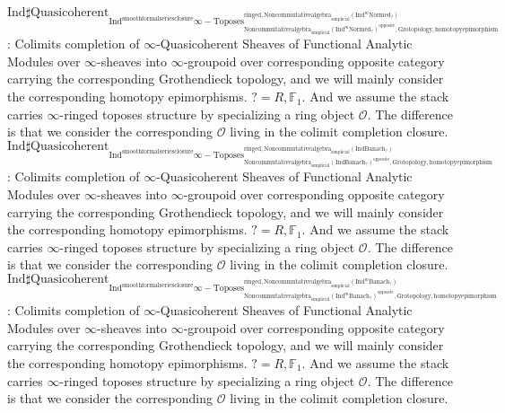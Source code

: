 \documentclass[11pt]{book}
\theoremstyle{definition}
\numberwithin{equation}{section}
\begin{document}
\noindent $\mathrm{Ind}\mathrm{\sharp Quasicoherent}_{\mathrm{Ind}^\text{smoothformalseriesclosure}\infty-\mathrm{Toposes}^{\mathrm{ringed},\mathrm{Noncommutativealgebra}_{\mathrm{simplicial}}(\mathrm{Ind}^m\mathrm{Normed}_?)}_{\mathrm{Noncommutativealgebra}_{\mathrm{simplicial}}(\mathrm{Ind}^m\mathrm{Normed}_?)^\mathrm{opposite},\mathrm{Grotopology,homotopyepimorphism}}}$: Colimits completion of $\infty$-Quasicoherent Sheaves of Functional Analytic Modules over $\infty$-sheaves into $\infty$-groupoid over corresponding opposite category carrying the corresponding Grothendieck topology, and we will mainly consider the corresponding homotopy epimorphisms. $?=R,\mathbb{F}_1$. And we assume the stack carries $\infty$-ringed toposes structure by specializing a ring object $\mathcal{O}$. The difference is that we consider the corresponding $\mathcal{O}$ living in the colimit completion closure.\\
\noindent $\mathrm{Ind}\mathrm{\sharp Quasicoherent}_{\mathrm{Ind}^\text{smoothformalseriesclosure}\infty-\mathrm{Toposes}^{\mathrm{ringed},\mathrm{Noncommutativealgebra}_{\mathrm{simplicial}}(\mathrm{Ind}\mathrm{Banach}_?)}_{\mathrm{Noncommutativealgebra}_{\mathrm{simplicial}}(\mathrm{Ind}\mathrm{Banach}_?)^\mathrm{opposite},\mathrm{Grotopology,homotopyepimorphism}}}$: Colimits completion of $\infty$-Quasicoherent Sheaves of Functional Analytic Modules over $\infty$-sheaves into $\infty$-groupoid over corresponding opposite category carrying the corresponding Grothendieck topology, and we will mainly consider the corresponding homotopy epimorphisms. $?=R,\mathbb{F}_1$. And we assume the stack carries $\infty$-ringed toposes structure by specializing a ring object $\mathcal{O}$. The difference is that we consider the corresponding $\mathcal{O}$ living in the colimit completion closure.\\
\noindent $\mathrm{Ind}\mathrm{\sharp Quasicoherent}_{\mathrm{Ind}^\text{smoothformalseriesclosure}\infty-\mathrm{Toposes}^{\mathrm{ringed},\mathrm{Noncommutativealgebra}_{\mathrm{simplicial}}(\mathrm{Ind}^m\mathrm{Banach}_?)}_{\mathrm{Noncommutativealgebra}_{\mathrm{simplicial}}(\mathrm{Ind}^m\mathrm{Banach}_?)^\mathrm{opposite},\mathrm{Grotopology,homotopyepimorphism}}}$: Colimits completion of $\infty$-Quasicoherent Sheaves of Functional Analytic Modules over $\infty$-sheaves into $\infty$-groupoid over corresponding opposite category carrying the corresponding Grothendieck topology, and we will mainly consider the corresponding homotopy epimorphisms. $?=R,\mathbb{F}_1$. And we assume the stack carries $\infty$-ringed toposes structure by specializing a ring object $\mathcal{O}$. The difference is that we consider the corresponding $\mathcal{O}$ living in the colimit completion closure.\\ 
\end{document}
